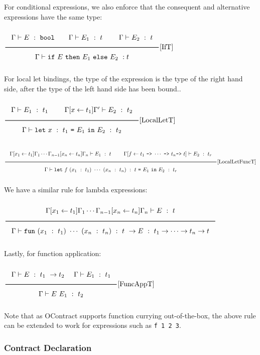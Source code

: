 \documentclass[a4paper]{article}
\newcommand{\Rule}[2]{\genfrac{}{}{0.7pt}{}{{\setlength{\fboxrule}{0pt}\setlength{\fboxsep}{3mm}\fbox{$#1$}}}{{\setlength{\fboxrule}{0pt}\setlength{\fboxsep}{3mm}\fbox{$#2$}}}}
\newcommand{\RuleWithName}[3]{\genfrac{}{}{0.7pt}{}{{\setlength{\fboxrule}{0pt}\setlength{\fboxsep}{3mm}\fbox{$#1$}}}{{\setlength{\fboxrule}{0pt}\setlength{\fboxsep}{3mm}\fbox{$#2$}}}[\text{#3}]}
\newcommand{\Bool}{\texttt{bool}}
\begin{document}
For conditional expressions, we also enforce that the consequent and alternative expressions have the same type:

\begin{center}
    $\RuleWithName{\Gamma \vdash E\ :\ \Bool \qquad \Gamma \vdash E_1\ :\ t\ \qquad \Gamma \vdash E_2\ :\ t}{\Gamma \vdash \texttt{if}\ E\ \texttt{then}\ E_1\ \texttt{else}\ E_2\ : t}{IfT}$
\end{center}

For local let bindings, the type of the expression is the type of the right hand side, after the type of the left hand side has been bound..

\begin{center}
    $\RuleWithName{\Gamma \vdash E_1\ :\ t_1\ \qquad \Gamma [x \leftarrow t_1]\Gamma' \vdash E_2\ :\ t_2}{\Gamma \vdash \texttt{let}\ x\ :\ t_1\ \texttt{=}\ E_1\ \texttt{in}\ E_2\ :\ t_2}{LocalLetT}$

    $\RuleWithName{\Gamma [x_1 \leftarrow t_1] \Gamma_1 \cdots \Gamma_{n-1} [x_n \leftarrow t_n] \Gamma_n \vdash E_1\ :\ t\ \qquad \Gamma [f \leftarrow t_1\ \texttt{->}\ \cdots\ \texttt{->}\ t_n \texttt{->}\ t] \vdash E_2\ :\ t_r}
    {\Gamma \vdash \texttt{let}\ f\ (x_1\ :\ t_1)\ \cdots\ (x_n\ :\ t_n)\ :\ t\ \texttt{=}\ E_1\ \texttt{in}\ E_2\ :\ t_r}{LocalLetFuncT}$
\end{center}

We have a similar rule for lambda expressions:

\begin{center}
    $\Rule{\Gamma [x_1 \leftarrow t_1]\Gamma_1 \cdots \Gamma_{n-1}[x_n \leftarrow t_n]\Gamma_n \vdash E\ :\ t}
        {\Gamma \vdash \texttt{fun}\ (x_1\ :\ t_1)\ \cdots\ (x_n\ :\ t_n)\ :\ t\ \rightarrow E\ :\ t_1 \rightarrow \cdots \rightarrow t_n \rightarrow t}$
\end{center}

Lastly, for function application:

\begin{center}
    $\RuleWithName{\Gamma \vdash E\ :\ t_1\ \rightarrow t_2\ \quad \Gamma \vdash E_1\ :\ t_1}{\Gamma \vdash E\ E_1\ :\ t_2}{FuncAppT}$
\end{center}

Note that as OContract supports function currying out-of-the-box, the above rule can be extended to work for expressions such as \verb|f 1 2 3|.

\subsubsection{Contract Declaration}
\end{document}
